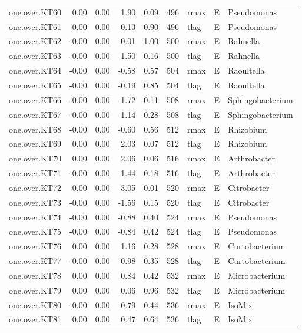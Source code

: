 \begin{table}[ht]
\begin{tabular}{rrrrrrlll}
  one.over.KT60 & 0.00 & 0.00 & 1.90 & 0.09 & 496 & rmax & E & Pseudomonas \\ 
  one.over.KT61 & 0.00 & 0.00 & 0.13 & 0.90 & 496 & tlag & E & Pseudomonas \\ 
  one.over.KT62 & -0.00 & 0.00 & -0.01 & 1.00 & 500 & rmax & E & Rahnella \\ 
  one.over.KT63 & -0.00 & 0.00 & -1.50 & 0.16 & 500 & tlag & E & Rahnella \\ 
  one.over.KT64 & -0.00 & 0.00 & -0.58 & 0.57 & 504 & rmax & E & Raoultella \\ 
  one.over.KT65 & -0.00 & 0.00 & -0.19 & 0.85 & 504 & tlag & E & Raoultella \\ 
  one.over.KT66 & -0.00 & 0.00 & -1.72 & 0.11 & 508 & rmax & E & Sphingobacterium \\ 
  one.over.KT67 & -0.00 & 0.00 & -1.14 & 0.28 & 508 & tlag & E & Sphingobacterium \\ 
  one.over.KT68 & -0.00 & 0.00 & -0.60 & 0.56 & 512 & rmax & E & Rhizobium \\ 
  one.over.KT69 & 0.00 & 0.00 & 2.03 & 0.07 & 512 & tlag & E & Rhizobium \\ 
  one.over.KT70 & 0.00 & 0.00 & 2.06 & 0.06 & 516 & rmax & E & Arthrobacter \\ 
  one.over.KT71 & -0.00 & 0.00 & -1.44 & 0.18 & 516 & tlag & E & Arthrobacter \\ 
  one.over.KT72 & 0.00 & 0.00 & 3.05 & 0.01 & 520 & rmax & E & Citrobacter \\ 
  one.over.KT73 & -0.00 & 0.00 & -1.56 & 0.15 & 520 & tlag & E & Citrobacter \\ 
  one.over.KT74 & -0.00 & 0.00 & -0.88 & 0.40 & 524 & rmax & E & Pseudomonas \\ 
  one.over.KT75 & -0.00 & 0.00 & -0.84 & 0.42 & 524 & tlag & E & Pseudomonas \\ 
  one.over.KT76 & 0.00 & 0.00 & 1.16 & 0.28 & 528 & rmax & E & Curtobacterium \\ 
  one.over.KT77 & -0.00 & 0.00 & -0.98 & 0.35 & 528 & tlag & E & Curtobacterium \\ 
  one.over.KT78 & 0.00 & 0.00 & 0.84 & 0.42 & 532 & rmax & E & Microbacterium \\ 
  one.over.KT79 & 0.00 & 0.00 & 0.06 & 0.96 & 532 & tlag & E & Microbacterium \\ 
  one.over.KT80 & -0.00 & 0.00 & -0.79 & 0.44 & 536 & rmax & E & IsoMix \\ 
  one.over.KT81 & 0.00 & 0.00 & 0.47 & 0.64 & 536 & tlag & E & IsoMix \\ 

\end{tabular}
\end{table}

